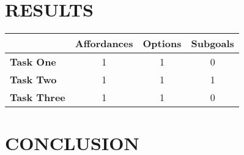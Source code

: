 \documentclass[]{article}
\begin{document}
\section{RESULTS}

\begin{tabular}{ l || c | c | c }
  & Affordances & Options & Subgoals \\
  \hline
  {\bf Task One} & 1 & 1 & 0 \\
  {\bf Task Two} & 1 & 1 & 1 \\
  {\bf Task Three} & 1 & 1 & 0 \\
\end{tabular}


\section{CONCLUSION}


  
\end{document}
